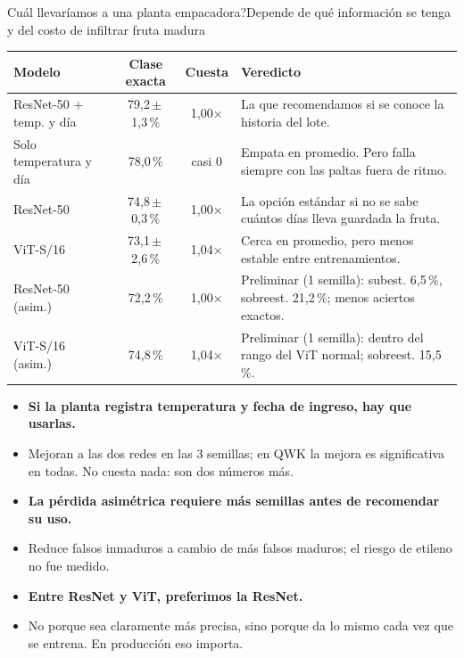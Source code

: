 \documentclass[aspectratio=169,11pt,table]{beamer}
\begin{document}
\begin{frame}{\textquestiondown{}Cuál llevaríamos a una planta empacadora?}{Depende de qué información se tenga y del costo de infiltrar fruta madura}
{\tiny
\centering
\begin{tabular}{l c c >{\raggedright\arraybackslash}p{}}
\toprule
\rowcolor{verdeosc}\color{white}\bfseries Modelo & \color{white}\bfseries Clase exacta & \color{white}\bfseries Cuesta & \color{white}\bfseries Veredicto \\
\midrule
\rowcolor{verdecla!22}ResNet-50 + temp. y día & 79{,}2\,$\pm$\,1{,}3\,\% & 1,00$\times$ & La que recomendamos si se conoce la historia del lote. \\
Solo temperatura y día & 78{,}0\,\% & casi 0 & Empata en promedio. Pero falla siempre con las paltas fuera de ritmo. \\
ResNet-50 & 74{,}8\,$\pm$\,0{,}3\,\% & 1,00$\times$ & La opción estándar si no se sabe cuántos días lleva guardada la fruta. \\
ViT-S/16 & 73{,}1\,$\pm$\,2{,}6\,\% & 1{,}04$\times$ & Cerca en promedio, pero menos estable entre entrenamientos. \\
ResNet-50 (asim.) & 72{,}2\,\% & 1,00$\times$ & Preliminar (1 semilla): subest. 6{,}5\,\%, sobreest. 21{,}2\,\%; menos aciertos exactos. \\
ViT-S/16 (asim.) & 74{,}8\,\% & 1{,}04$\times$ & Preliminar (1 semilla): dentro del rango del ViT normal; sobreest. 15{,}5\,\%. \\
\bottomrule
\end{tabular}
}
\vspace{0.35em}
{\tiny
\setlength{\itemsep}{0.18em}
\begin{itemize}
  \item {\bfseries Si la planta registra temperatura y fecha de ingreso, hay que usarlas.}
  \item Mejoran a las dos redes en las 3 semillas; en QWK la mejora es significativa en todas. No cuesta nada: son dos números más.
  \item {\bfseries La pérdida asimétrica requiere más semillas antes de recomendar su uso.}
  \item Reduce falsos inmaduros a cambio de más falsos maduros; el riesgo de etileno no fue medido.
  \item {\bfseries Entre ResNet y ViT, preferimos la ResNet.}
  \item No porque sea claramente más precisa, sino porque da lo mismo cada vez que se entrena. En producción eso importa.
\end{itemize}
}
\end{frame}
\end{document}
